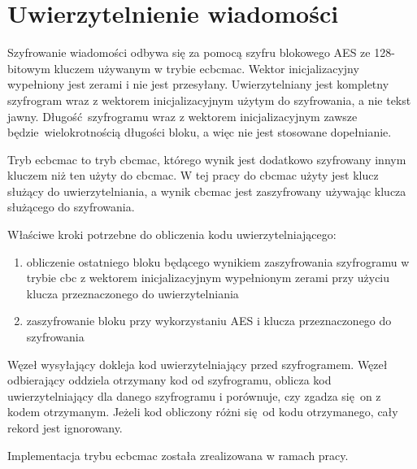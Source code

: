 \section{Uwierzytelnienie wiadomości}
\label{sec:auth}

Szyfrowanie wiadomości odbywa się za pomocą szyfru blokowego AES ze 128-bitowym kluczem używanym w trybie \gls{ecbcmac}. Wektor inicjalizacyjny wypełniony jest zerami i nie jest przesyłany. Uwierzytelniany jest kompletny szyfrogram wraz z wektorem inicjalizacyjnym użytym do szyfrowania, a nie tekst jawny. Długość szyfrogramu wraz z wektorem inicjalizacyjnym zawsze będzie wielokrotnością długości bloku, a więc nie jest stosowane dopełnianie.

Tryb \gls{ecbcmac} to tryb \gls{cbcmac}, którego wynik jest dodatkowo szyfrowany innym kluczem niż ten użyty do \gls{cbcmac}. W tej pracy do \gls{cbcmac} użyty jest klucz służący do uwierzytelniania, a wynik \gls{cbcmac} jest zaszyfrowany używając klucza służącego do szyfrowania.

Właściwe kroki potrzebne do obliczenia kodu uwierzytelniającego:

\begin{enumerate}
\item obliczenie ostatniego bloku będącego wynikiem zaszyfrowania szyfrogramu w trybie \gls{cbc} z wektorem inicjalizacyjnym wypełnionym zerami przy użyciu klucza przeznaczonego do uwierzytelniania
\item zaszyfrowanie bloku przy wykorzystaniu AES i klucza przeznaczonego do szyfrowania
\end{enumerate}

Węzeł wysyłający dokleja kod uwierzytelniający przed szyfrogramem. Węzeł odbierający oddziela otrzymany kod od szyfrogramu, oblicza kod uwierzytelniający dla danego szyfrogramu i porównuje, czy zgadza się on z kodem otrzymanym. Jeżeli kod obliczony różni się od kodu otrzymanego, cały rekord jest ignorowany.

Implementacja trybu \gls{ecbcmac} została zrealizowana w ramach pracy.
